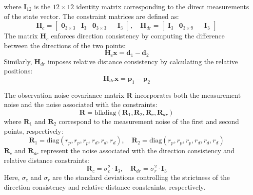 where $\mathbf{I}_{12}$ is the $12 \times 12$ identity matrix corresponding to the direct measurements of the state vector. The constraint matrices are defined as:
\begin{equation}
\mathbf{H}_c = \begin{bmatrix}
\mathbf{0}_{3 \times 3} & \mathbf{I}_3 & \mathbf{0}_{3 \times 3} & -\mathbf{I}_3
\end{bmatrix}, \quad
\mathbf{H}_{dr} = \begin{bmatrix}
\mathbf{I}_3 & \mathbf{0}_{3 \times 9} & -\mathbf{I}_3
\end{bmatrix}
\end{equation}
The matrix $\mathbf{H}_c$ enforces direction consistency by computing the difference between the directions of the two points:
\begin{equation}
\mathbf{H}_c \mathbf{x} = 
\mathbf d_1 - \mathbf d_2
\end{equation}
Similarly, $\mathbf{H}_{dr}$ imposes relative distance consistency by calculating the relative positions:
\begin{equation}
\mathbf{H}_{dr} \mathbf{x} = 
\mathbf p_1 - \mathbf p_2
\end{equation}

The observation noise covariance matrix $\mathbf{R}$ incorporates both the measurement noise and the noise associated with the constraints:
\begin{equation}
\mathbf{R} = \text{blkdiag}(\mathbf{R}_1, \mathbf{R}_2, \mathbf{R}_c, \mathbf{R}_{dr})
\end{equation}
where $\mathbf{R}_1$ and $\mathbf{R}_2$ correspond to the measurement noise of the first and second points, respectively:
\begin{equation}
\mathbf{R}_1 = \text{diag}(r_p, r_p, r_p, r_d, r_d, r_d), \quad
\mathbf{R}_2 = \text{diag}(r_p, r_p, r_p, r_d, r_d, r_d)
\end{equation}
$\mathbf{R}_c$ and $\mathbf{R}_{dr}$ represent the noise associated with the direction consistency and relative distance constraints:
\begin{equation}
\mathbf{R}_c = \sigma_c^2 \cdot \mathbf{I}_3, \quad
\mathbf{R}_{dr} = \sigma_r^2 \cdot \mathbf{I}_3
\end{equation}
Here, $\sigma_c$ and $\sigma_r$ are the standard deviations controlling the strictness of the direction consistency and relative distance constraints, respectively.

